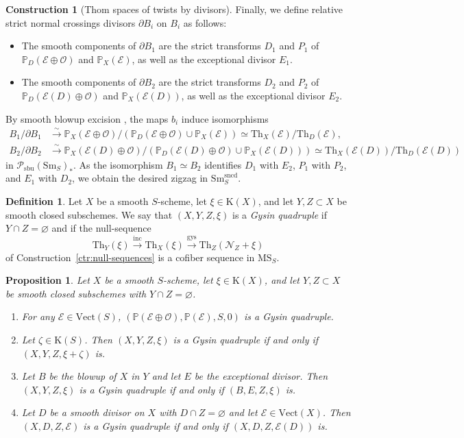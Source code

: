 \documentclass{amsart}
\numberwithin{equation}{section}
\theoremstyle{plain}
\newtheorem{proposition}[equation]{Proposition}
\theoremstyle{definition}
\newtheorem{definition}[equation]{Definition}
\newtheorem{construction}[equation]{Construction}
\let\scr=\mathcal
\let\bb=\mathbb
\def\P{\bb P}
\def\simto{\xrightarrow{\sim}}
\let\emptyset=\varnothing
\def\Th{\mathrm{Th}}
\let\cat=\mathrm
\def\K{\mathrm{K}{}}
\def\Sm{{\cat{S}\mathrm{m}}}
\def\Vect{\cat{V}\mathrm{ect}{}}
\def\MS{\mathrm{MS}}
\def\sbu{\mathrm{sbu}}
\def\sncd{\mathrm{sncd}}
\def\gys{\mathrm{gys}{}}
\begin{document}
\begin{construction}[Thom spaces of twists by divisors]
Finally, we define relative strict normal crossings divisors $\partial B_i$ on $B_i$ as follows:
\begin{itemize}
\item The smooth components of $\partial B_1$ are the strict transforms $D_1$ and $P_1$ of $\P_D(\scr E \oplus \scr O)$ and $\P_X(\scr E)$, as well as the exceptional divisor $E_1$.
\item The smooth components of $\partial B_2$ are the strict transforms $D_2$ and $P_2$ of $\P_D(\scr E(D) \oplus \scr O)$ and $\P_X(\scr E(D))$, as well as the exceptional divisor $E_2$.
\end{itemize}
By smooth blowup excision \cite[Proposition 2.7]{AHI}, the maps $b_i$ induce isomorphisms
\begin{align*}
B_1/\partial B_1 &\simto \P_X(\scr E \oplus \scr O) / (\P_D(\scr E \oplus \scr O) \cup \P_X(\scr E)) \simeq \Th_X(\scr E) / \Th_D(\scr E), \\
B_2 / \partial B_2 & \simto \P_X(\scr E(D) \oplus \scr O) / (\P_D(\scr E(D) \oplus \scr O) \cup \P_X(\scr E(D))) \simeq \Th_X(\scr E(D)) / \Th_D(\scr E(D))
\end{align*}
in $\scr P_{\sbu}(\Sm_S)_*$.
As the isomorphism $B_1 \simeq B_2$ identifies $D_1$ with $E_2$, $P_1$ with $P_2$, and $E_1$ with $D_2$, we obtain the desired zigzag in $\Sm_S^\sncd$.
\end{construction}

\begin{definition}
	Let $X$ be a smooth $S$-scheme, let $\xi\in\K(X)$, and let $Y,Z\subset X$ be smooth closed subschemes.
	We say that $(X,Y,Z,\xi)$ is a \emph{Gysin quadruple} if $Y\cap Z =\emptyset$ and if the null-sequence
	\[
	\Th_{Y}(\xi) \xrightarrow{\mathrm{inc}} \Th_{X}(\xi) \xrightarrow{\gys}\Th_{Z}(\scr N_Z+\xi)
	\]
	of Construction~\ref{ctr:null-sequences} is a cofiber sequence in $\MS_S$.
\end{definition}

\begin{proposition}\label{prop:gys-cofib}
Let $X$ be a smooth $S$-scheme, let $\xi\in \K(X)$, and let $Y,Z\subset X$ be smooth closed subschemes with $Y\cap Z=\emptyset$.
\begin{enumerate}
	\item For any $\scr E\in\Vect(S)$, $(\P(\scr E\oplus\scr O),\P(\scr E),S,0)$ is a Gysin quadruple.
	\item Let $\zeta\in\K(S)$. Then $(X,Y,Z,\xi)$ is a Gysin quadruple if and only if $(X,Y,Z,\xi+\zeta)$ is.
	\item Let $B$ be the blowup of $X$ in $Y$ and let $E$ be the exceptional divisor. Then $(X,Y,Z,\xi)$ is a Gysin quadruple if and only if $(B,E,Z,\xi)$ is.
	\item Let $D$ be a smooth divisor on $X$ with $D\cap Z=\emptyset$ and let $\scr E\in\Vect(X)$. Then $(X,D,Z,\scr E)$ is a Gysin quadruple if and only if $(X,D,Z,\scr E(D))$ is.
\end{enumerate}
\end{proposition}
\end{document}
